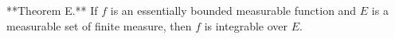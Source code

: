 **Theorem E.** If $f$ is an essentially bounded measurable function and $E$ is a measurable set of finite measure, then $f$ is integrable over $E$.

